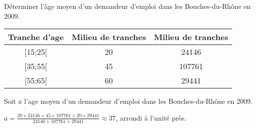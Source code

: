 
Déterminer l’âge moyen d’un demandeur d’emploi dans les Bouches-du-Rhône en 2009.

\begin{tabular}{|c|c|c|}
\hline 
Tranche d'age& Milieu de tranches   & Milieu de tranches \\ 
\hline 
[15;25[ & 20& 24146\\ 
\hline 
[35;55[ & 45& 107761  \\ 
\hline 
[55;65[& 60 & 29441  \\ 
\hline  
\end{tabular}

Soit $\overline{a}$ l'age moyen d’un demandeur d’emploi dans les Bouches-du-Rhône en 2009.

$\overline{a} = \frac{20 \times 24146 + 45 \times 107761 + 20 \times 29441}{24146 +  107761 + 29441} \approx 37 $, arrondi à l'unité près.
